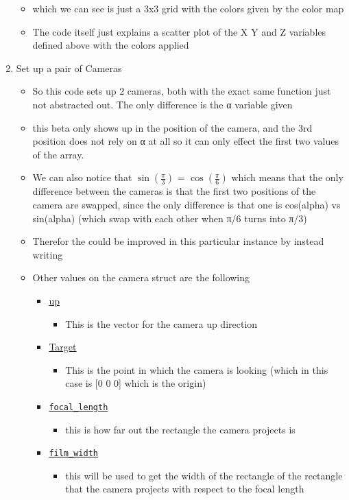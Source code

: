 \documentclass{article}
\begin{document}
\begin{enumerate}
\begin{itemize}
\item which we can see is just a 3x3 grid with the colors given by the
color map
\item The code itself just explains a scatter plot of the X Y and Z
variables defined above with the colors applied
\end{itemize}
\item Set up a pair of Cameras
\label{sec-2-3}
\begin{itemize}
\item So this code sets up 2 cameras, both with the exact same function
just not abstracted out. The only difference is the α variable given
\item this beta only shows up in the position of the camera, and the 3rd
position does not rely on α at all so it can only effect the first two
values of the array.
\item We can also notice that $\sin(\frac{π}{3})$ = $\cos(\frac{π}{6})$
which means that the only difference between the cameras is that the
first two positions of the camera are swapped, since the only
difference is that one is cos(alpha) vs sin(alpha) (which swap with
each other when π/6 turns into π/3)
\item Therefor the could be improved in this particular instance by
instead writing
\item Other values on the camera struct are the following
\begin{itemize}
\item \uline{up}
\begin{itemize}
\item This is the vector for the camera up direction
\end{itemize}
\item \uline{Target}
\begin{itemize}
\item This is the point in which the camera is looking (which in this
case is [0 0 0] which is the origin)
\end{itemize}
\item \uline{\texttt{focal\_length}}
\begin{itemize}
\item this is how far out the rectangle the camera projects is
\end{itemize}
\item \uline{\texttt{film\_width}}
\begin{itemize}
\item this will be used to get the width of the rectangle of the
rectangle that the camera projects with respect to the focal length

\end{itemize}
\end{itemize}
\end{itemize}
\end{enumerate}
\end{document}
